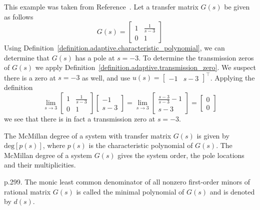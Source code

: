 \begin{example}
  This example was taken from Reference~\cite{dahleh.lectures.2011}.
  Let a transfer matrix $G(s)$ be given as follows
  \begin{equation*}
    G(s)=
    \begin{bmatrix}
      1 & \frac{1}{s-3} \\
      0 & 1
    \end{bmatrix}
  \end{equation*}
  Using Definition~\ref{definition.adaptive.characteristic_polynomial}, we can determine that $G(s)$ has a pole at $s=-3$.
  To determine the transmission zeros of $G(s)$ we apply Definition~\ref{definition.adaptive.transmission_zero}.
  We suspect there is a zero at $s=-3$ as well, and use $u(s)=\begin{bmatrix} -1 & s-3 \end{bmatrix}^{\top}$.
  Applying the definition
  \begin{equation*}
    \lim_{s\rightarrow3}
    \begin{bmatrix}
      1 & \frac{1}{s-3} \\
      0 & 1
    \end{bmatrix}
    \begin{bmatrix}
      -1 \\
      s-3
    \end{bmatrix}
    =
    \lim_{s\rightarrow3}
    \begin{bmatrix}
      \frac{s-3}{s-3}-1 \\
      s-3
    \end{bmatrix}
    =
    \begin{bmatrix}
      0 \\
      0
    \end{bmatrix}
  \end{equation*}
  we see that there is in fact a transmission zero at $s=-3$.
\end{example}

\begin{defn-dan}
  The McMillan degree of a system with transfer matrix $G(s)$ is given by $\text{deg}[p(s)]$, where $p(s)$ is the characteristic polynomial of $G(s)$.
  The McMillan degree of a system $G(s)$ gives the system order, the pole locations and their multiplicities.
\end{defn-dan}

\begin{defn-dan}\cite{antsaklis.linearsystems.2006}
  p.299.
  The monic least common denominator of all nonzero first-order minors of rational matrix $G(s)$ is called the minimal polynomial of $G(s)$ and is denoted by $d(s)$.
\end{defn-dan}

